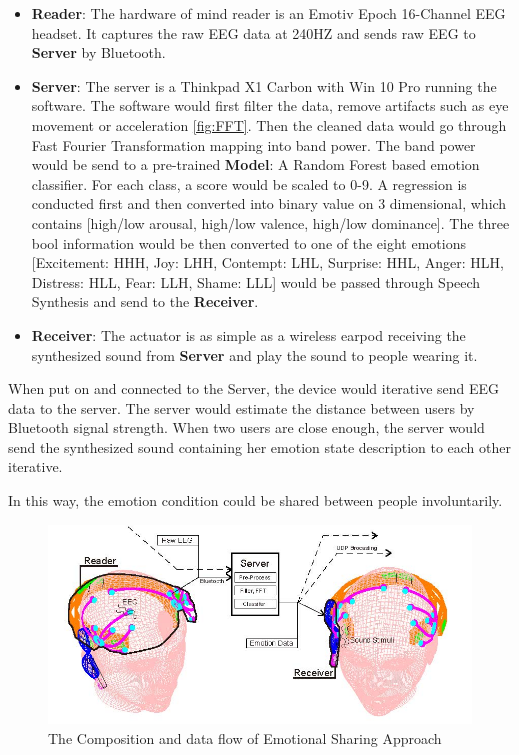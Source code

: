 \documentclass[a4paper]{article}
\begin{document}
\begin{itemize}
    \item \textbf {Reader}: The hardware of mind reader is an Emotiv Epoch 16-Channel EEG headset. It captures the raw EEG data at 240HZ and sends raw EEG to \textbf{Server} by Bluetooth.
    \item \textbf {Server}: The server is a Thinkpad X1 Carbon with Win 10 Pro running the software. The software would first filter the data, remove artifacts such as eye movement or acceleration \autocite{le2011method} \ref{fig:FFT}. Then the cleaned data would go through Fast Fourier Transformation mapping into band power. The band power would be send to a pre-trained \textbf{Model}: A Random Forest based emotion classifier. For each class, a score would be scaled to 0-9. A regression is conducted first and then converted into binary value on 3 dimensional, which contains [high/low arousal, high/low valence, high/low dominance]. The three bool information would be then converted to one of the eight emotions [Excitement: HHH, Joy: LHH, Contempt: LHL, Surprise: HHL, Anger: HLH, Distress: HLL, Fear: LLH, Shame: LLL] would be passed through Speech Synthesis and send to the \textbf{Receiver}.
    \item \textbf{Receiver}: The actuator is as simple as a wireless earpod receiving the synthesized sound from \textbf {Server} and play the sound to people wearing it.
\end{itemize}

When put on and connected to the Server, the device would iterative send EEG data to the server. The server would estimate the distance between users by Bluetooth signal strength. When two users are close enough, the server would send the synthesized sound containing her emotion state description to each other iterative.

In this way, the emotion condition could be shared between people involuntarily.

\begin{figure}
	\centering
	\includegraphics[width=\linewidth]{Diagram_2}
	\caption{The Composition and data flow of Emotional Sharing Approach}
	\label{fig:Lietome}
\end{figure}
\end{document}
